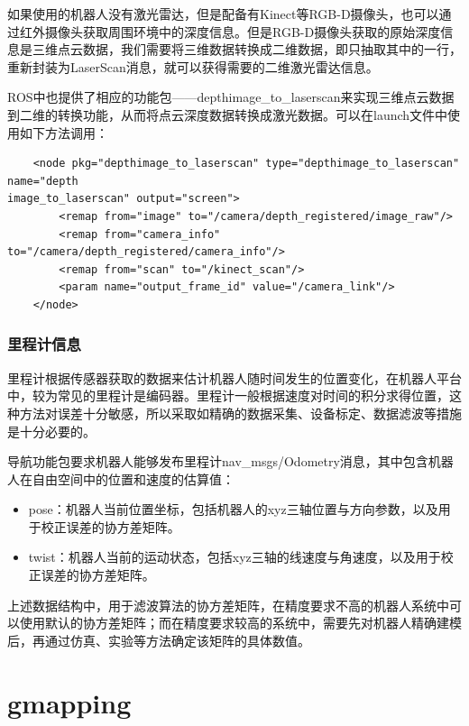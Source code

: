 \documentclass[9pt, oneside]{book}
\begin{document}
如果使用的机器人没有激光雷达，但是配备有Kinect等RGB-D摄像头，也可以通过红外摄像头获取周围环境中的深度信息。但是RGB-D摄像头获取的原始深度信息是三维点云数据，我们需要将三维数据转换成二维数据，即只抽取其中的一行，重新封装为LaserScan消息，就可以获得需要的二维激光雷达信息。

ROS中也提供了相应的功能包——depthimage\_to\_laserscan来实现三维点云数据到二维的转换功能，从而将点云深度数据转换成激光数据。可以在launch文件中使用如下方法调用：

\begin{verbatim}
    <node pkg="depthimage_to_laserscan" type="depthimage_to_laserscan" name="depth
image_to_laserscan" output="screen">
        <remap from="image" to="/camera/depth_registered/image_raw"/> 
        <remap from="camera_info" to="/camera/depth_registered/camera_info"/>
        <remap from="scan" to="/kinect_scan"/>
        <param name="output_frame_id" value="/camera_link"/>
    </node>
\end{verbatim}

\subsubsection{里程计信息}

里程计根据传感器获取的数据来估计机器人随时间发生的位置变化，在机器人平台中，较为常见的里程计是编码器。里程计一般根据速度对时间的积分求得位置，这种方法对误差十分敏感，所以采取如精确的数据采集、设备标定、数据滤波等措施是十分必要的。

导航功能包要求机器人能够发布里程计nav\_msgs/Odometry消息，其中包含机器人在自由空间中的位置和速度的估算值：

\begin{itemize}
    \item pose：机器人当前位置坐标，包括机器人的xyz三轴位置与方向参数，以及用于校正误差的协方差矩阵。
    \item twist：机器人当前的运动状态，包括xyz三轴的线速度与角速度，以及用于校正误差的协方差矩阵。
\end{itemize}

\textcolor[rgb]{1,0,0}{上述数据结构中，用于滤波算法的协方差矩阵，在精度要求不高的机器人系统中可以使用默认的协方差矩阵；而在精度要求较高的系统中，需要先对机器人精确建模后，再通过仿真、实验等方法确定该矩阵的具体数值。}

\section{gmapping}
\end{document}
